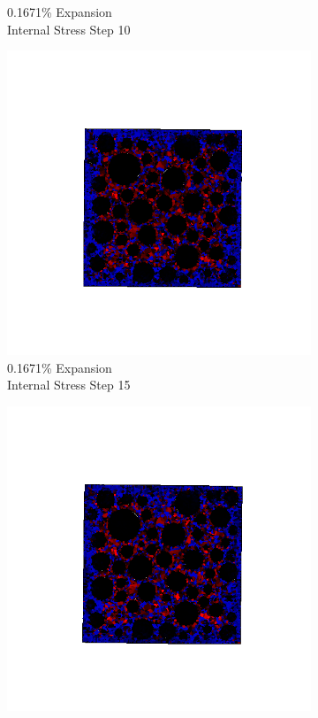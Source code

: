 \begin{figure}[ht!]
\begin{subfigure}{.25\textwidth}
      \caption{0.1671\% Expansion\\Internal Stress Step 10}
    \end{subfigure}%
    \begin{subfigure}{.25\textwidth}
      \centering
      \includegraphics[width=1.0\linewidth]{Files/exp_3D/DEF/A30X-5C_1_s15.png}
      \caption{0.1671\% Expansion\\Internal Stress Step 15}
    \end{subfigure}%
    \begin{subfigure}{.25\textwidth}
      \centering
      \includegraphics[width=1.0\linewidth]{Files/exp_3D/DEF/A30X-5C_1_stress.png}

\end{subfigure}
\end{figure}
